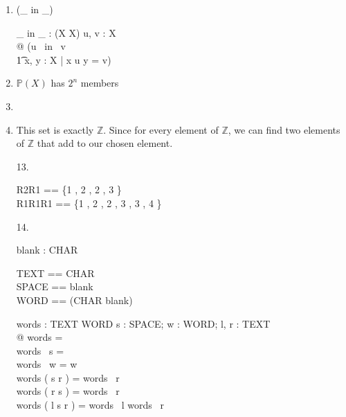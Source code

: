 \documentclass[12pt,letterpaper]{article}
\begin{document}
\begin{enumerate}
    \pagebreak

    \item
      \begin{zed}
        \relation(\_ in \_)
      \end{zed}
      \begin{gendef}[X]
        \_ in \_ : (\seq X \rel \seq X)
      \where
        \forall u, v : \seq X \\
        @ (u \ in \ v \iff \\
        \t1 \exists x, y : \seq X | x \cat u \cat y = v)
      \end{gendef}

    \item
      $\mathbb{P}(X)$ has $2^n$ members

    \item

    \item
      This set is exactly $\mathbb{Z}$.
      Since for every element of $\mathbb{Z}$,
      we can find two elements of $\mathbb{Z}$ that add to our chosen element.

    \item[13.]
      \begin{zed}
        R2R1 == \{1 , 2 , 2 , 3 \} \\
        R1R1R1 == \{1 , 2 , 2 , 3 , 3 , 4 \}
      \end{zed}

    \item[14.]
      \begin{zed}
        [CHAR]
      \end{zed}

      \begin{axdef}
        blank : \power CHAR
      \end{axdef}
      \begin{zed}
        TEXT == \seq CHAR \\
        SPACE == \seq blank \\
        WORD == \seq (CHAR \setminus blank)
      \end{zed}
      \begin{axdef}
        words : TEXT \fun \seq WORD
      \where
        \forall s : SPACE; w : WORD; l, r : TEXT \\
        @     words \langle \rangle     = \langle \rangle \\
        \land words \ s                 = \langle \rangle \\
        \land words \ w                 = \langle w \rangle \\
        \land words ( s \cat r )        = words \ r \\
        \land words ( r \cat s )        = words \ r \\
        \land words ( l \cat s \cat r ) = words \ l \cat words \ r
      \end{axdef}
  \end{enumerate}
\end{document}
